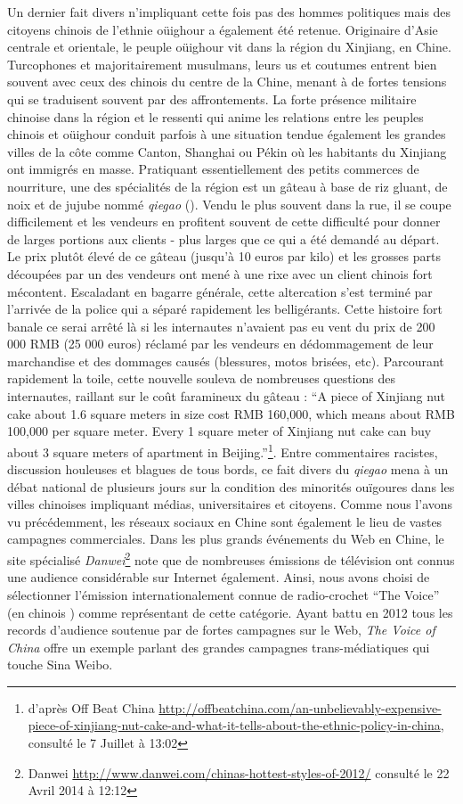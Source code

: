 Un dernier fait divers n'impliquant cette fois pas des hommes politiques mais des citoyens chinois de l'ethnie oüighour a également été retenue. Originaire d'Asie centrale et orientale, le peuple oüighour vit dans la région du Xinjiang, en Chine. Turcophones et majoritairement musulmans, leurs us et coutumes entrent bien souvent avec ceux des chinois du centre de la Chine, menant à de fortes tensions qui se traduisent souvent par des affrontements. La forte présence militaire chinoise dans la région et le ressenti qui anime les relations entre les peuples chinois et oüighour conduit parfois à une situation tendue également les grandes villes de la côte comme Canton, Shanghai ou Pékin où les habitants du Xinjiang ont immigrés en masse. Pratiquant essentiellement des petits commerces de nourriture, une des spécialités de la région est un gâteau à base de riz gluant, de noix et de jujube nommé \textit{qiegao} (). Vendu le plus souvent dans la rue, il se coupe difficilement et les vendeurs en profitent souvent de cette difficulté pour donner de larges portions aux clients - plus larges que ce qui a été demandé au départ. Le prix plutôt élevé de ce gâteau (jusqu'à 10 euros par kilo) et les grosses parts découpées par un des vendeurs ont mené à une rixe avec un client chinois fort mécontent. Escaladant en bagarre générale, cette altercation s'est terminé par l'arrivée de la police qui a séparé rapidement les belligérants. Cette histoire fort banale ce serai arrêté là si les internautes n'avaient pas eu vent du prix de 200 000 RMB (25 000 euros) réclamé par les vendeurs en dédommagement de leur marchandise et des dommages causés (blessures, motos brisées, etc). Parcourant rapidement la toile, cette nouvelle souleva de nombreuses questions des internautes, raillant sur le coût faramineux du gâteau : ``A piece of Xinjiang nut cake about 1.6 square meters in size cost RMB 160,000, which means about RMB 100,000 per square meter. Every 1 square meter of Xinjiang nut cake can buy about 3 square meters of apartment in Beijing.''\footnote{d'après Off Beat China \url{http://offbeatchina.com/an-unbelievably-expensive-piece-of-xinjiang-nut-cake-and-what-it-tells-about-the-ethnic-policy-in-china}, consulté le 7 Juillet à 13:02}. Entre commentaires racistes, discussion houleuses et blagues de tous bords, ce fait divers du \textit{qiegao} mena à un débat national de plusieurs jours sur la condition des minorités ouïgoures dans les villes chinoises impliquant médias, universitaires et citoyens. Comme nous l'avons vu précédemment, les réseaux sociaux en Chine sont également le lieu de vastes campagnes commerciales. Dans les plus  grands événements du Web en Chine, le site spécialisé \textit{Danwei}\footnote{ Danwei \url{http://www.danwei.com/chinas-hottest-styles-of-2012/} consulté le 22 Avril 2014 à 12:12} note que de nombreuses émissions de télévision ont connus une audience considérable sur Internet également. Ainsi, nous avons choisi de sélectionner l'émission internationalement connue de radio-crochet ``The Voice'' (en chinois ) comme représentant de cette catégorie. Ayant battu en 2012 tous les records d'audience soutenue par de fortes campagnes sur le Web, \textit{The Voice of China} offre un exemple parlant des grandes campagnes trans-médiatiques qui touche Sina Weibo.

